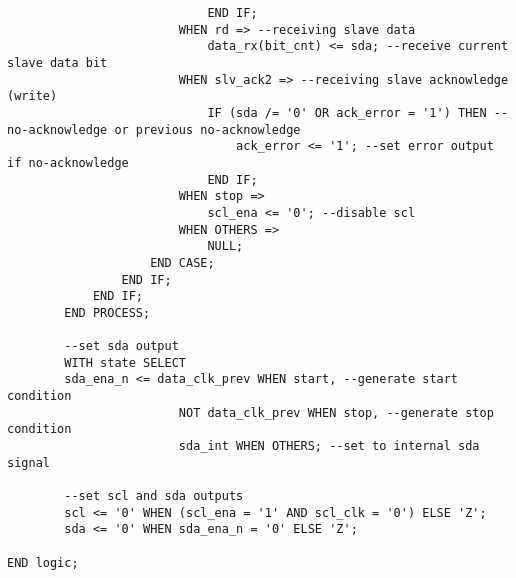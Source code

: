 \begin{lstlisting}
                            END IF;
                        WHEN rd => --receiving slave data
                            data_rx(bit_cnt) <= sda; --receive current slave data bit
                        WHEN slv_ack2 => --receiving slave acknowledge (write)
                            IF (sda /= '0' OR ack_error = '1') THEN --no-acknowledge or previous no-acknowledge
                                ack_error <= '1'; --set error output if no-acknowledge
                            END IF;
                        WHEN stop => 
                            scl_ena <= '0'; --disable scl
                        WHEN OTHERS => 
                            NULL;
                    END CASE;
                END IF;
            END IF;
        END PROCESS; 

        --set sda output
        WITH state SELECT
        sda_ena_n <= data_clk_prev WHEN start, --generate start condition
                        NOT data_clk_prev WHEN stop, --generate stop condition
                        sda_int WHEN OTHERS; --set to internal sda signal 
    
        --set scl and sda outputs
        scl <= '0' WHEN (scl_ena = '1' AND scl_clk = '0') ELSE 'Z';
        sda <= '0' WHEN sda_ena_n = '0' ELSE 'Z';
    
END logic;
\end{lstlisting}

